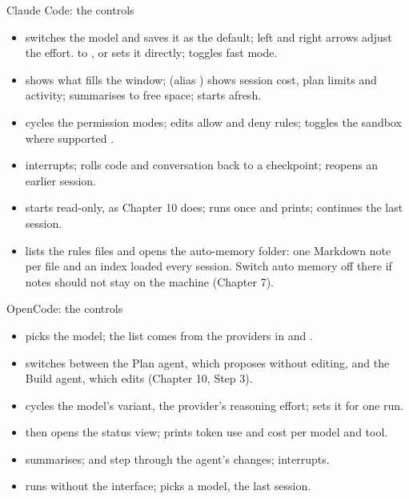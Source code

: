 \documentclass[11pt,aspectratio=169]{beamer}
\begin{document}
\begin{frame}{Claude Code: the controls}
  \begin{itemize}
    \item {} switches the model and saves it as the default;
      left and right arrows adjust the effort.  to
      ,  or  sets it directly;
       toggles fast mode.
    \item {} shows what fills the window; 
      (alias ) shows session cost, plan limits and activity;
       summarises to free space;  starts afresh.
    \item {} cycles the permission modes; 
      edits allow and deny rules;  toggles the sandbox where
      supported \parencite{anthropic2025sandboxing}.
    \item {} interrupts;  rolls code and conversation
      back to a checkpoint;  reopens an earlier session.
    \item {} starts read-only, as Chapter 10
      does;  runs once and prints; 
      continues the last session.
    \item {} lists the rules files and opens the auto-memory
      folder: one Markdown note per file and an index loaded every session.
      Switch auto memory off there if notes should not stay on the machine
      (Chapter 7).
  \end{itemize}
\end{frame}

\begin{frame}{OpenCode: the controls}
  \begin{itemize}
    \item {} picks the model; the list comes from the providers
      in  and .
    \item {} switches between the Plan agent, which proposes without
      editing, and the Build agent, which edits (Chapter 10, Step 3).
    \item {} cycles the model's variant, the provider's reasoning
      effort;  sets it for one run.
    \item {} then  opens the status view;  prints token use and cost per model and tool.
    \item {} summarises;  and  step
      through the agent's changes;  interrupts.
    \item {} runs without the interface;
       picks a model,  the last
      session.
  \end{itemize}
\end{frame}
\end{document}
